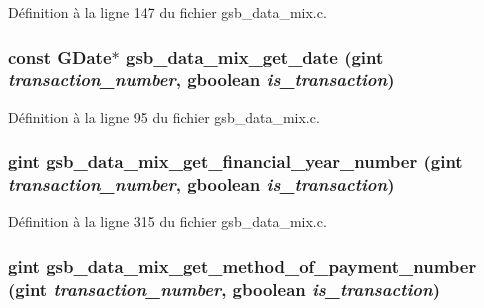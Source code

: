Définition à la ligne 147 du fichier gsb\_\-data\_\-mix.c.

\subsubsection[{gsb\_\-data\_\-mix\_\-get\_\-date}]{\setlength{\rightskip}{0pt plus 5cm}const GDate$\ast$ gsb\_\-data\_\-mix\_\-get\_\-date (gint {\em transaction\_\-number}, \/  gboolean {\em is\_\-transaction})}\label{gsb__data__mix_8h_a60cef843742c4b8ab778e9e368f6853c}


Définition à la ligne 95 du fichier gsb\_\-data\_\-mix.c.

\subsubsection[{gsb\_\-data\_\-mix\_\-get\_\-financial\_\-year\_\-number}]{\setlength{\rightskip}{0pt plus 5cm}gint gsb\_\-data\_\-mix\_\-get\_\-financial\_\-year\_\-number (gint {\em transaction\_\-number}, \/  gboolean {\em is\_\-transaction})}\label{gsb__data__mix_8h_a963227d3abcb625b80b421a19801a0a5}


Définition à la ligne 315 du fichier gsb\_\-data\_\-mix.c.

\subsubsection[{gsb\_\-data\_\-mix\_\-get\_\-method\_\-of\_\-payment\_\-number}]{\setlength{\rightskip}{0pt plus 5cm}gint gsb\_\-data\_\-mix\_\-get\_\-method\_\-of\_\-payment\_\-number (gint {\em transaction\_\-number}, \/  gboolean {\em is\_\-transaction})}\label{gsb__data__mix_8h_adfdc384233ca30c861e7b1673034fcf6}


